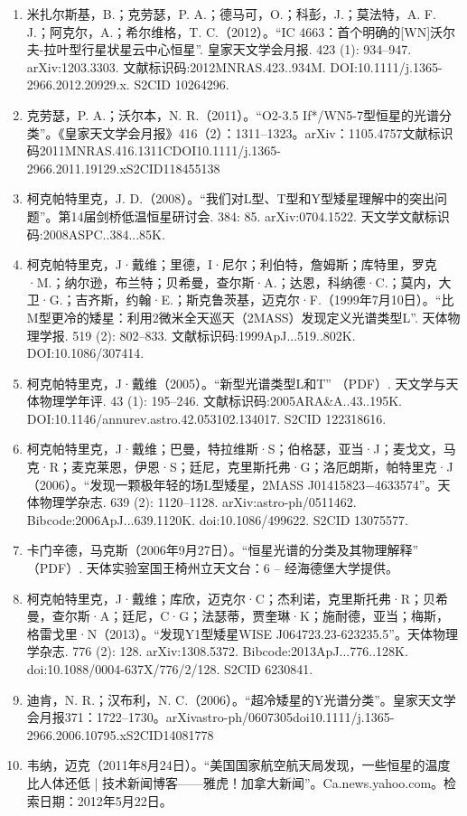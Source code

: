 \begin{enumerate}
\item 米扎尔斯基，B.；克劳瑟，P. A.；德马可，O.；科彭，J.；莫法特，A. F. J.；阿克尔，A.；希尔维格，T. C.（2012）。“IC 4663：首个明确的[WN]沃尔夫-拉叶型行星状星云中心恒星”. 皇家天文学会月报. 423 (1): 934–947. arXiv:1203.3303. 文献标识码:2012MNRAS.423..934M. DOI:10.1111/j.1365-2966.2012.20929.x. S2CID 10264296.
\item 克劳瑟，P. A.；沃尔本，N. R.（2011）。“O2-3.5 If*/WN5-7型恒星的光谱分类”。《皇家天文学会月报》416（2）：1311–1323。arXiv：1105.4757文献标识码2011MNRAS.416.1311CDOI10.1111/j.1365-2966.2011.19129.xS2CID118455138
\item 柯克帕特里克，J. D.（2008）。“我们对L型、T型和Y型矮星理解中的突出问题”。第14届剑桥低温恒星研讨会. 384: 85. arXiv:0704.1522. 天文学文献标识码:2008ASPC..384...85K.
\item 柯克帕特里克，J·戴维；里德，I·尼尔；利伯特，詹姆斯；库特里，罗克·M.；纳尔逊，布兰特；贝希曼，查尔斯·A.；达恩，科纳德·C.；莫内，大卫·G.；吉齐斯，约翰·E.；斯克鲁茨基，迈克尔·F.（1999年7月10日）。“比M型更冷的矮星：利用2微米全天巡天（2MASS）发现定义光谱类型L”. 天体物理学报. 519 (2): 802–833. 文献标识码:1999ApJ...519..802K. DOI:10.1086/307414.
\item 柯克帕特里克，J·戴维（2005）。“新型光谱类型L和T” （PDF）. 天文学与天体物理学年评. 43 (1): 195–246. 文献标识码:2005ARA&A..43..195K. DOI:10.1146/annurev.astro.42.053102.134017. S2CID 122318616.
\item 柯克帕特里克，J·戴维；巴曼，特拉维斯·S；伯格瑟，亚当·J；麦戈文，马克·R；麦克莱恩，伊恩·S；廷尼，克里斯托弗·G；洛厄朗斯，帕特里克·J（2006）。“发现一颗极年轻的场L型矮星，2MASS J01415823−4633574”。天体物理学杂志. 639 (2): 1120–1128. arXiv:astro-ph/0511462. Bibcode:2006ApJ...639.1120K. doi:10.1086/499622. S2CID 13075577.
\item 卡门辛德，马克斯（2006年9月27日）。“恒星光谱的分类及其物理解释” （PDF）. 天体实验室国王椅州立天文台：6 – 经海德堡大学提供。
\item 柯克帕特里克，J·戴维；库欣，迈克尔·C；杰利诺，克里斯托弗·R；贝希曼，查尔斯·A；廷尼，C·G；法瑟蒂，贾奎琳·K；施耐德，亚当；梅斯，格雷戈里·N（2013）。“发现Y1型矮星WISE J064723.23-623235.5”。天体物理学杂志. 776 (2): 128. arXiv:1308.5372. Bibcode:2013ApJ...776..128K. doi:10.1088/0004-637X/776/2/128. S2CID 6230841.
\item 迪肯，N. R.；汉布利，N. C.（2006）。“超冷矮星的Y光谱分类”。皇家天文学会月报371：1722–1730。arXivastro-ph/0607305doi10.1111/j.1365-2966.2006.10795.xS2CID14081778
\item 韦纳，迈克（2011年8月24日）。“美国国家航空航天局发现，一些恒星的温度比人体还低 | 技术新闻博客——雅虎！加拿大新闻”。Ca.news.yahoo.com。检索日期：2012年5月22日。

\end{enumerate}
